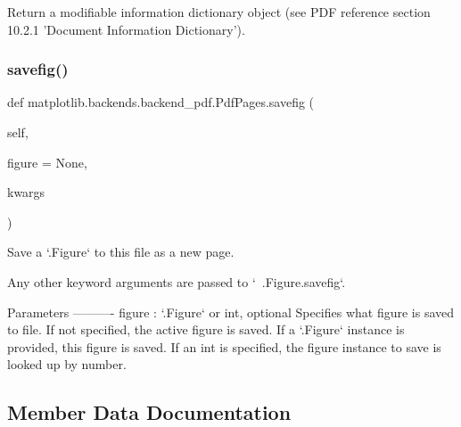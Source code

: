 \begin{DoxyVerb}Return a modifiable information dictionary object
(see PDF reference section 10.2.1 'Document Information
Dictionary').
\end{DoxyVerb}
 \mbox{\label{classmatplotlib_1_1backends_1_1backend__pdf_1_1PdfPages_a42c462ddfed8228465fefb9321ac4858}} 
\subsubsection{\texorpdfstring{savefig()}{savefig()}}
{\footnotesize\ttfamily def matplotlib.\+backends.\+backend\+\_\+pdf.\+Pdf\+Pages.\+savefig (\begin{DoxyParamCaption}\item[{}]{self,  }\item[{}]{figure = {\ttfamily None},  }\item[{}]{kwargs }\end{DoxyParamCaption})}

\begin{DoxyVerb}Save a `.Figure` to this file as a new page.

Any other keyword arguments are passed to `~.Figure.savefig`.

Parameters
----------
figure : `.Figure` or int, optional
    Specifies what figure is saved to file. If not specified, the
    active figure is saved. If a `.Figure` instance is provided, this
    figure is saved. If an int is specified, the figure instance to
    save is looked up by number.
\end{DoxyVerb}
 

\subsection{Member Data Documentation}
\mbox{\label{classmatplotlib_1_1backends_1_1backend__pdf_1_1PdfPages_a15f6698aedae6a9d6c4c26b88daea5d3}} 
